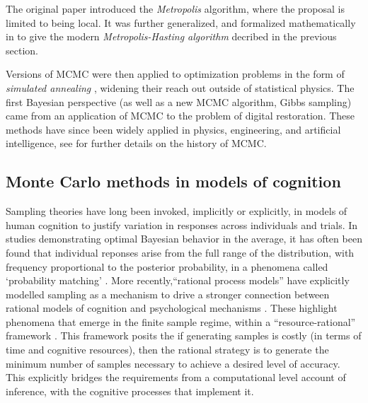 The original paper \citet{metropolis1953equation} introduced the \textit{Metropolis} algorithm, where the proposal is limited to being local. It was further generalized, and formalized mathematically in \citet{hastings1970monte} to give the modern \textit{Metropolis-Hasting algorithm} decribed in the previous section.

Versions of MCMC were then applied to optimization problems in the form of \textit{simulated annealing} \cite{kirkpatrick1983optimization}, widening their reach out outside of statistical physics. The first Bayesian perspective (as well as a new MCMC algorithm, Gibbs sampling) came from an application of MCMC to the problem of digital restoration\cite{geman1984stochastic}. These methods have since been widely applied in physics, engineering, and artificial intelligence, see \citet{richey2010evolution} for further details on the history of MCMC.


\subsection{Monte Carlo methods in models of cognition}

Sampling theories have long been invoked, implicitly or explicitly, in models of human cognition to justify variation in responses across individuals and trials. In studies demonstrating optimal Bayesian behavior in the average, it has often been found that individual reponses arise from the full range of the distribution, with frequency proportional to the posterior probability, in a phenomena called `probability matching' \citep{wozny2010,Denison2013,Moreno11,Vul2014}. More recently,``rational process models'' have explicitly modelled sampling as a mechanism to drive a stronger connection between rational models of cognition and psychological mechanisms \cite{griffiths2012bridging, Vul2014, shi10, sanborn2010rational, Lieder2013}. These highlight phenomena that emerge in the finite sample regime, within a ``resource-rational'' framework \citep{Vul2014,griffiths2015,Gershman2015,schulz2016simple}. This framework posits the if generating samples is costly (in terms of time and cognitive resources), then the rational strategy is to generate the minimum number of samples necessary to achieve a desired level of accuracy. This explicitly bridges the requirements from a computational level account of inference, with the cognitive processes that implement it. 

